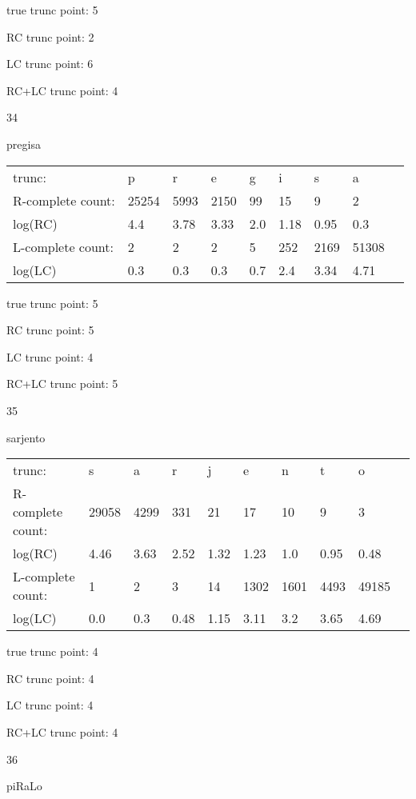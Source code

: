 \documentclass{article}
\begin{document}
true trunc point: 5

RC trunc point: 2

LC trunc point: 6

RC+LC trunc point: 4

\vspace{1em}

34

pregisa

\begin{tabular}{l|llllllll}
trunc: & p & r & e & g & i & s & a & \\ 
R-complete count: & 25254 & 5993 & 2150 & 99 & 15 & 9 & 2 & \\ 
log(RC) & 4.4 & 3.78 & 3.33 & 2.0 & 1.18 & 0.95 & 0.3 & \\ 
L-complete count: & 2 & 2 & 2 & 5 & 252 & 2169 & 51308 & \\ 
log(LC) & 0.3 & 0.3 & 0.3 & 0.7 & 2.4 & 3.34 & 4.71 & \\ 
\end{tabular}

true trunc point: 5

RC trunc point: 5

LC trunc point: 4

RC+LC trunc point: 5

\vspace{1em}

35

sarjento

\begin{tabular}{l|lllllllll}
trunc: & s & a & r & j & e & n & t & o & \\ 
R-complete count: & 29058 & 4299 & 331 & 21 & 17 & 10 & 9 & 3 & \\ 
log(RC) & 4.46 & 3.63 & 2.52 & 1.32 & 1.23 & 1.0 & 0.95 & 0.48 & \\ 
L-complete count: & 1 & 2 & 3 & 14 & 1302 & 1601 & 4493 & 49185 & \\ 
log(LC) & 0.0 & 0.3 & 0.48 & 1.15 & 3.11 & 3.2 & 3.65 & 4.69 & \\ 
\end{tabular}

true trunc point: 4

RC trunc point: 4

LC trunc point: 4

RC+LC trunc point: 4

\vspace{1em}

36

piRaLo
\end{document}
